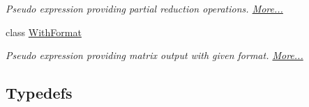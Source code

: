 \begin{DoxyCompactItemize}
\begin{DoxyCompactList}\small\item\em Pseudo expression providing partial reduction operations.  \hyperlink{group___core___module_class_eigen_1_1_vectorwise_op}{More...}\end{DoxyCompactList}\item 
class \hyperlink{group___core___module_class_eigen_1_1_with_format}{With\+Format}
\begin{DoxyCompactList}\small\item\em Pseudo expression providing matrix output with given format.  \hyperlink{group___core___module_class_eigen_1_1_with_format}{More...}\end{DoxyCompactList}\end{DoxyCompactItemize}
\subsection*{Typedefs}
